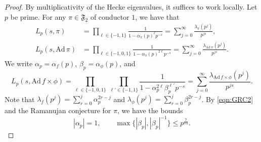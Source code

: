 \documentclass[10pt,a4paper]{amsart}
\begin{document}
\begin{proof}
By multiplicativity of the Hecke eigenvalues, it suffices to work locally.  Let $p$ be prime.  For any $\pi\in\mathfrak{F}_2$ of conductor $1$, we have that
\begin{align*}
L_p(s,\pi) &= \prod_{\ell\in\{-1,1\}}\frac{1}{1-\alpha_{\pi}(p)^{\ell} p^{-s}}=\sum_{j=0}^{\infty}\frac{\lambda_{\pi}(p^j)}{p^{js}},\\
L_p(s,\mathrm{Ad}\, \pi) &= \prod_{\ell\in\{-1,0,1\}}\frac{1}{1-\alpha_{\pi}(p)^{2\ell} p^{-s}}=\sum_{j=0}^{\infty}\frac{\lambda_{\mathrm{Ad}\, \pi}(p^j)}{p^{js}}.
\end{align*}
We write $\alpha_p = \alpha_{f}(p)$, $\beta_p = \alpha_{\phi}(p)$, and
\[
L_p(s,\mathrm{Ad}\, f \times \phi) = \prod_{\ell \in\{-1,0,1\}}\,\prod_{\ell'\in\{-1,1\}}\frac{1}{1-\alpha_p^{2\ell} \beta_p^{\ell'} p^{-s}}=\sum_{j=0}^{\infty}\frac{\lambda_{\mathrm{Ad}\, f\times\phi}(p^j)}{p^{js}}.
\]
Note that $\lambda_f(p^j)= \sum_{r=0}^j \alpha_p^{2r-j}$ and $\lambda_{\phi}(p^j)= \sum_{r=0}^j \beta_p^{2r-j}$.  By \eqref{eqn:GRC2} and the Ramanujan conjecture for $\pi$, we have the bounds
\begin{equation}
\label{eqn:GRC2}
|\alpha_p|=1,\qquad \max\{|\beta_p|,|\beta_p|^{-1}\}\leq p^{\frac{7}{64}}.
\end{equation}


\end{proof}
\end{document}
